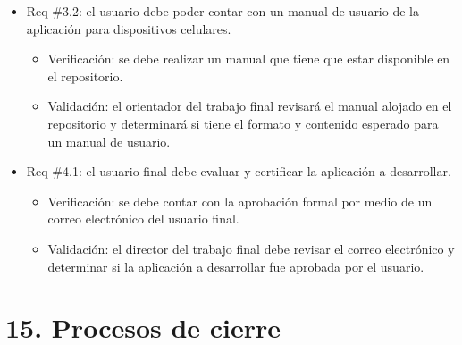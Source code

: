 \documentclass[
11pt, %
]{charter}
\begin{document}
\begin{itemize}
\item Req \#3.2: el usuario debe poder contar con un manual de usuario de la aplicación para dispositivos celulares.

\begin{itemize}
	\item Verificación: se debe realizar un manual que tiene que estar disponible en el repositorio.
	\item Validación: el orientador del trabajo final revisará el manual alojado en el repositorio y determinará si tiene el formato y contenido esperado para un manual de usuario.
\end{itemize}

\item Req \#4.1: el usuario final debe evaluar y certificar la aplicación a desarrollar.

\begin{itemize}
	\item Verificación: se debe contar con la aprobación formal por medio de un correo electrónico del usuario final.
	\item Validación: el director del trabajo final debe revisar el correo electrónico y determinar si la aplicación a desarrollar fue aprobada por el usuario.
\end{itemize}



\end{itemize}

\section{15. Procesos de cierre}    
\label{sec:cierre}
\end{document}
